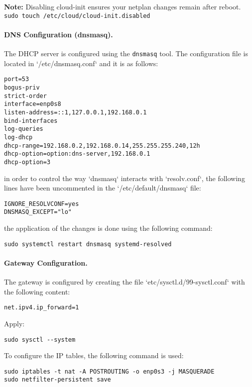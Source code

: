 \textbf{Note:} Disabling cloud-init ensures your netplan changes remain after reboot. \texttt{sudo touch /etc/cloud/cloud-init.disabled}

\paragraph{DNS Configuration (dnsmasq).}

The DHCP server is configured using the \texttt{dnsmasq} tool. The configuration file is located in `/etc/dnsmasq.conf` and it is as follows:

\begin{verbatim}
port=53
bogus-priv
strict-order
interface=enp0s8
listen-address=::1,127.0.0.1,192.168.0.1
bind-interfaces
log-queries
log-dhcp
dhcp-range=192.168.0.2,192.168.0.14,255.255.255.240,12h
dhcp-option=option:dns-server,192.168.0.1
dhcp-option=3
\end{verbatim}

in order to control the way `dnsmasq` interacts with `resolv.conf`, the following lines have been uncommented in the `/etc/default/dnsmasq` file:
\begin{verbatim}
IGNORE_RESOLVCONF=yes
DNSMASQ_EXCEPT="lo"
\end{verbatim}
the application of the changes is done using the following command:
\begin{verbatim}
sudo systemctl restart dnsmasq systemd-resolved
\end{verbatim}

\paragraph{Gateway Configuration.}


The gateway is configured by creating the file `etc/sysctl.d/99-sysctl.conf` with the following content:

\begin{verbatim}
net.ipv4.ip_forward=1
\end{verbatim}
Apply:
\begin{verbatim}
sudo sysctl --system
\end{verbatim}
To configure the IP tables, the following command is used:
\begin{verbatim}
sudo iptables -t nat -A POSTROUTING -o enp0s3 -j MASQUERADE
sudo netfilter-persistent save
\end{verbatim}

